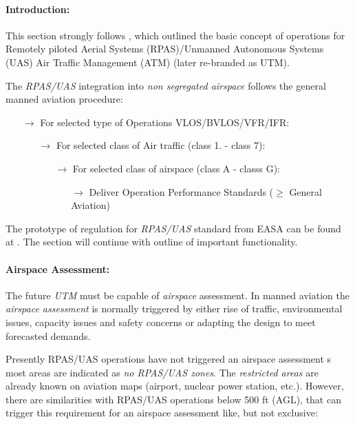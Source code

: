 \setcounter{chapter}{6}
\setcounter{section}{7}
\setcounter{subsection}{3}

\paragraph{Introduction:} This section strongly follows \cite{eurocontrol2018rpasatm}, which outlined the basic concept of operations for Remotely piloted Aerial Systems (RPAS)/Unmanned Autonomous Systems (UAS) Air Traffic Management (ATM) (later re-branded as UTM).

The \emph{RPAS/UAS} integration into \emph{non segregated airspace} follows the general manned aviation procedure:
\begin{itemize}
    \item[$\to$] For selected type of Operations VLOS/BVLOS/VFR/IFR:
    \begin{itemize}
        \item[$\to$] For selected class of Air traffic (class 1. - class 7):
        \begin{itemize}
            \item[$\to$] For selected class of airspace (class A -  classs G):
            \begin{itemize}
                \item[$\to$] Deliver Operation Performance Standards ($\ge$ General Aviation)
            \end{itemize}
        \end{itemize}
    \end{itemize}
\end{itemize}

\noindent  The prototype of regulation for \emph{RPAS/UAS} standard from EASA can be found at \cite{easa2016rpasroperegul}. The section will continue with outline of important functionality.

\paragraph{Airspace Assessment:} The future \emph{UTM} must be capable of \emph{airspace} assessment. In manned aviation the \emph{airspace assessment} is normally triggered by either rise of traffic, environmental issues, capacity issues and safety concerns or adapting the design to meet forecasted demands.

Presently RPAS/UAS operations have not triggered an airspace assessment s most areas are indicated as \emph{no RPAS/UAS zones}. The \emph{restricted areas} are already known on aviation maps (airport, nuclear power station, etc.). However, there are similarities with RPAS/UAS operations below 500 ft (AGL), that can trigger this requirement for an airspace assessment like, but not exclusive:


